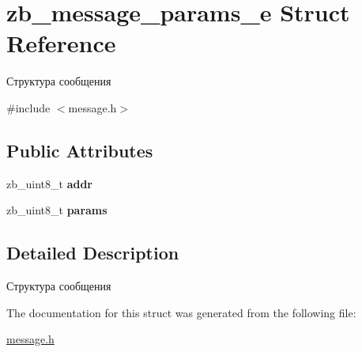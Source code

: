 \hypertarget{structzb__message__params__e}{}\section{zb\+\_\+message\+\_\+params\+\_\+e Struct Reference}
\label{structzb__message__params__e}


Структура сообщения  




{\ttfamily \#include $<$message.\+h$>$}

\subsection*{Public Attributes}
\begin{DoxyCompactItemize}
\item 
\mbox{\label{structzb__message__params__e_a8b2ce45d9f10af11c99bd32e87d07ae5}} 
zb\+\_\+uint8\+\_\+t {\bfseries addr}
\item 
\mbox{\label{structzb__message__params__e_ae7b0821cdb2698a60d7f7251db4dce9f}} 
zb\+\_\+uint8\+\_\+t {\bfseries params}
\end{DoxyCompactItemize}


\subsection{Detailed Description}
Структура сообщения 

The documentation for this struct was generated from the following file\+:\begin{DoxyCompactItemize}
\item 
\mbox{\hyperlink{message_8h}{message.\+h}}\end{DoxyCompactItemize}
